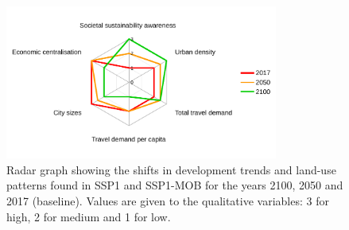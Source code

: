 \begin{figure}
\centering
\includegraphics[width=0.8\textwidth]{figures/radar_development-scenario}
\caption[Shifts in development and land-use patterns in SSP1-MOB.]{Radar graph showing the shifts in development trends and land-use patterns found in SSP1 and SSP1-MOB for the years 2100, 2050 and 2017 (baseline). Values are given to the qualitative variables: 3 for high, 2 for medium and 1 for low.}
\label{fig:results:radar_development-scenario}
\end{figure}
%
